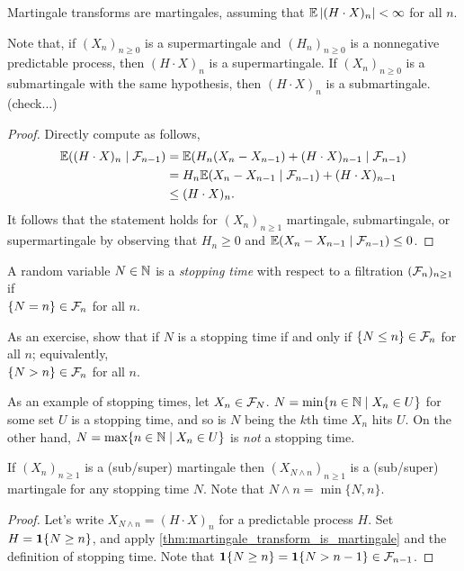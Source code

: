 \begin{theorem} \label{thm:martingale_transform_is_martingale}
    Martingale transforms are martingales, assuming that $\mathbb E \left\lvert (H \cdot X)_n \right\rvert < \infty$ for all $n$.
\end{theorem}
Note that, if $(X_n)_{n \geq 0}$ is a supermartingale and $(H_n)_{n \geq 0}$ is a nonnegative predictable process, then $(H \cdot X)_n$ is a supermartingale. If $(X_n)_{n \geq 0}$ is a submartingale with the same hypothesis, then $(H \cdot X)_n$ is a submartingale. {\color{crimson}(check...)}
\begin{proof}
    Directly compute as follows,
    \begin{align*}
        \mathbb E((H \cdot X)_n \mid \mathcal F_{n-1}) &= \mathbb E(H_n(X_n - X_{n-1}) + (H \cdot X)_{n-1} \mid \mathcal F_{n-1}) \\
        &= H_n \mathbb E(X_n - X_{n-1} \mid \mathcal F_{n-1}) + (H \cdot X)_{n-1} \\
        &\leq (H \cdot X)_n.
    \end{align*}
    It follows that the statement holds for $(X_n)_{n \geq 1}$ martingale, submartingale, or supermartingale by observing that $H_n \geq 0$ and $\mathbb E(X_n - X_{n-1} \mid \mathcal F_{n-1}) \leq 0$.
\end{proof}

\begin{definition} \label{defn:stopping_time}
    A random variable $N \in \mathbb N$ is a \textit{stopping time} with respect to a filtration $(\mathcal F_n)_{n \geq 1}$ if \\ $\{N = n\} \in \mathcal F_n$ for all $n$.
\end{definition}
As an exercise, show that if $N$ is a stopping time if and only if $\{N \leq n\} \in \mathcal F_n$ for all $n$; equivalently, \\ $\{N > n\} \in \mathcal F_n$ for all $n$.

\newpage
As an example of stopping times, let $X_n \in \mathcal F_N$. $N = \min\{n \in \mathbb N \mid X_n \in U\}$ for some set $U$ is a stopping time, and so is $N$ being the $k$th time $X_n$ hits $U$. On the other hand, $N = \max\{n \in \mathbb N \mid X_n \in U\}$ is \textit{not} a stopping time.

\begin{corollary} \label{cor:martingale_given_stopping_time}
    If $(X_n)_{n \geq 1}$ is a (sub/super) martingale then $(X_{N \wedge n})_{n \geq 1}$ is a (sub/super) martingale for any stopping time $N$. Note that $N \wedge n = \min\{N, n\}$.
\end{corollary}
\begin{proof}
    Let's write $X_{N \wedge n} = (H \cdot X)_n$ for a predictable process $H$. Set $H = \mathbf 1\{N \geq n\}$, and apply \ref{thm:martingale_transform_is_martingale} and the definition of stopping time. {\color{amethyst} Note that $\mathbf 1 \{N \geq n\} = \mathbf 1 \{N > n - 1\} \in \mathcal F_{n-1}$.}
\end{proof}

